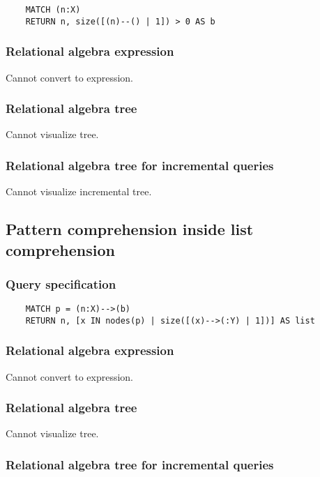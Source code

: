 	\begin{lstlisting}
	MATCH (n:X)
	RETURN n, size([(n)--() | 1]) > 0 AS b
	\end{lstlisting}


	\subsubsection*{Relational algebra expression}

	Cannot convert to expression.

	\subsubsection*{Relational algebra tree}

	Cannot visualize tree.

	\subsubsection*{Relational algebra tree for incremental queries}

	Cannot visualize incremental tree.
	\subsection{Pattern comprehension inside list comprehension}

	\subsubsection*{Query specification}

	\begin{lstlisting}
	MATCH p = (n:X)-->(b)
	RETURN n, [x IN nodes(p) | size([(x)-->(:Y) | 1])] AS list
	\end{lstlisting}


	\subsubsection*{Relational algebra expression}

	Cannot convert to expression.

	\subsubsection*{Relational algebra tree}

	Cannot visualize tree.

	\subsubsection*{Relational algebra tree for incremental queries}


